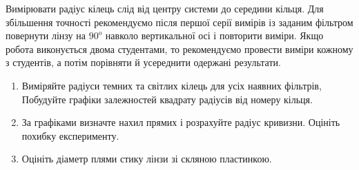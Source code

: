 Вимірювати радіус кілець слід від центру системи до середини кільця.
Для збільшення точності рекомендуємо після першої серії вимірів із заданим
фільтром повернути лінзу на $90^{o}$ навколо вертикальної осі і повторити виміри.
Якщо робота виконується двома студентами, то рекомендуємо провести виміри
кожному з студентів, а потім порівняти й усереднити одержані результати.

\begin{enumerate}
    \item Виміряйте радіуси темних та світлих кілець для усіх наявних фільтрів,
    Побудуйте графіки залежностей квадрату радіусів від номеру кільця.
    
    \item За графіками визначте нахил прямих і розрахуйте радіус кривизни. Оцініть похибку експерименту.

    \item Оцініть діаметр плями стику лінзи зі скляною пластинкою.
\end{enumerate}